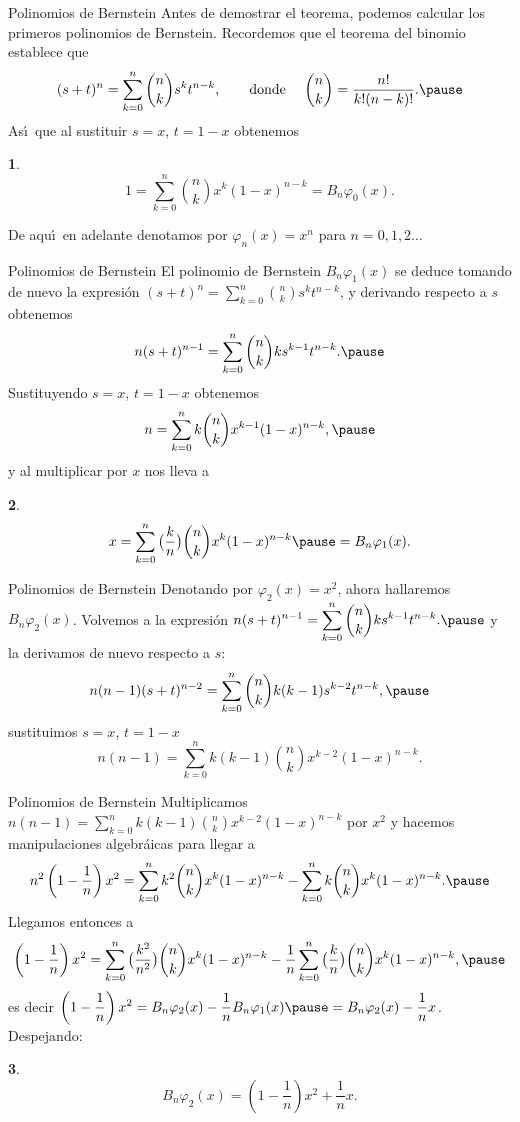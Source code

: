 \documentclass[xcolor=dvipsnames,10pt,handout, draft]{beamer}
\newtheorem*{afirma}{}
\begin{document}
\begin{frame}{Polinomios de Bernstein}
Antes de demostrar el teorema, podemos calcular los primeros polinomios de Bernstein. 
\vskip5pt\pause
Recordemos que el teorema del binomio establece que
$$(s+t)^n=\sum_{k=0}^n{n\choose k}s^kt^{n-k},\qquad\text{donde }\quad{n\choose k}=\frac{n!}{k!(n-k)!}.\pause$$
As\'\i\ que al sustituir $s=x$, $t=1-x$ obtenemos
\begin{afirma}
$$1=\sum_{k=0}^n{n\choose k}x^k(1-x)^{n-k}=B_n\varphi_0(x).$$ 
\end{afirma}\pause
De aqu\'\i\ en adelante denotamos por $\varphi_n(x)=x^n$ para $n=0,1,2\dots$
\end{frame}


\begin{frame}{Polinomios de Bernstein}
El polinomio de Bernstein $B_n\varphi_1(x)$ se deduce tomando de nuevo la expresi\'on $\displaystyle (s+t)^n=\sum_{k=0}^n{n\choose k}s^kt^{n-k}$, \pause
y derivando respecto a $s$ obtenemos
$$n(s+t)^{n-1}=\sum_{k=0}^n{n\choose k}ks^{k-1}t^{n-k}.\pause$$
Sustituyendo $s=x$, $t=1-x$ obtenemos
$$n=\sum_{k=0}^n k{n\choose k}x^{k-1}(1-x)^{n-k},\pause$$
y al multiplicar por $x$ nos lleva a 
\begin{afirma}
$$x=\sum_{k=0}^n\big(\frac{k}{n}\big){n\choose k}x^{k}(1-x)^{n-k}\pause=B_n\varphi_1(x).$$
\end{afirma}
\end{frame}


\begin{frame}{Polinomios de Bernstein}
Denotando por $\varphi_2(x)=x^2$, ahora hallaremos $B_n\varphi_2(x)$.
\vskip5pt\pause
Volvemos a la expresi\'on $\displaystyle n(s+t)^{n-1}=\sum_{k=0}^n{n\choose k}ks^{k-1}t^{n-k}.\pause$ y la derivamos de nuevo respecto a $s$:
$$n(n-1)(s+t)^{n-2}=\sum_{k=0}^n{n\choose k}k(k-1)s^{k-2}t^{n-k},\pause$$
sustituimos $s=x$, $t=1-x$
$$n(n-1)=\sum_{k=0}^nk(k-1){n\choose k}x^{k-2}(1-x)^{n-k}.$$
\end{frame}


\begin{frame}{Polinomios de Bernstein}
Multiplicamos $\displaystyle n(n-1)=\sum_{k=0}^nk(k-1){n\choose k}x^{k-2}(1-x)^{n-k}$ por $x^2$ y hacemos manipulaciones algebr\'aicas para llegar a \pause
$$n^2\left(1-\frac{1}{n}\right)x^2=\sum_{k=0}^nk^2{n\choose k}x^{k}(1-x)^{n-k}-\sum_{k=0}^nk{n\choose k}x^{k}(1-x)^{n-k}.\pause$$
Llegamos entonces a
$$\left(1-\frac{1}{n}\right)x^2=\sum_{k=0}^n\big(\frac{k^2}{n^2}\big){n\choose k}x^{k}(1-x)^{n-k}-\frac{1}{n}\sum_{k=0}^n\big(\frac{k}{n}\big){n\choose k}x^{k}(1-x)^{n-k},\pause$$
es decir $\displaystyle \left(1-\frac{1}{n}\right)x^2=B_n\varphi_2(x)-\frac{1}{n}B_n\varphi_1(x)\pause=B_n\varphi_2(x)-\frac{1}{n}x$. \pause Despejando:
\begin{afirma}
$$B_n\varphi_2(x)=\left(1-\frac{1}{n}\right)x^2+\frac{1}{n}x.$$
\end{afirma}
\end{frame}
\end{document}
